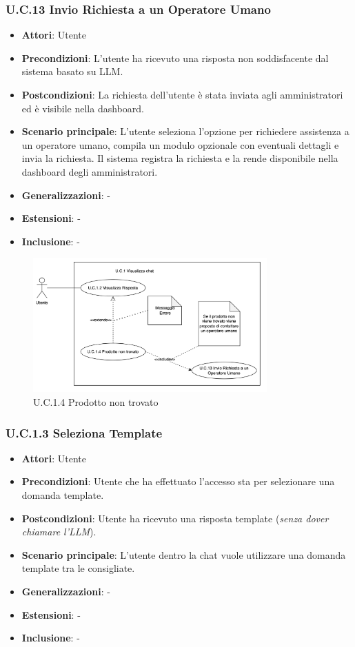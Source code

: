 \subsubsection{U.C.13 Invio Richiesta a un Operatore Umano}
\begin{itemize}
    \item \textbf{Attori}: Utente
    \item \textbf{Precondizioni}: L’utente ha ricevuto una risposta non soddisfacente dal sistema basato su LLM.
    \item \textbf{Postcondizioni}: La richiesta dell’utente è stata inviata agli amministratori ed è visibile nella dashboard.
    \item \textbf{Scenario principale}: L’utente seleziona l’opzione per richiedere assistenza a un operatore umano, compila un modulo opzionale con eventuali dettagli e invia la richiesta. Il sistema registra la richiesta e la rende disponibile nella dashboard degli amministratori.
    \item \textbf{Generalizzazioni}: -
    \item \textbf{Estensioni}: -
    \item \textbf{Inclusione}: -
\end{itemize}
\begin{figure}[H]
    \centering
    \includegraphics[width=0.8\textwidth]{img/UC1-4.png}
    \caption{U.C.1.4 Prodotto non trovato}
\end{figure}
\subsubsection{U.C.1.3 Seleziona Template}
\begin{itemize}
    \item \textbf{Attori}: Utente
    \item \textbf{Precondizioni}: Utente che ha effettuato l’accesso sta per selezionare una domanda template.
    \item \textbf{Postcondizioni}: Utente ha ricevuto una risposta template (\textit{senza dover chiamare l’LLM}).
    \item \textbf{Scenario principale}: L’utente dentro la chat vuole utilizzare una domanda template tra le consigliate.
    \item \textbf{Generalizzazioni}: -
    \item \textbf{Estensioni}: -
    \item \textbf{Inclusione}: -
\end{itemize}
